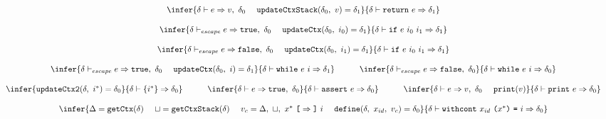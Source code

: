 \documentclass[11pt]{article}
\newcommand{\Term}[1]{\texttt{#1}}
\newcommand{\cs}[0]{\quad}
\newcommand{\symstate}[0]{\delta}
\newcommand{\symctx}[0]{\Delta}
\newcommand{\symctxstack}[0]{\sqcup}
\newcommand{\evalinst}[3]{#1 \vdash #2 \Rightarrow #3}
\newcommand{\evalexpr}[4]{#1 \vdash #2 \Rightarrow #3,\ #4}
\newcommand{\evalescexpr}[4]{#1 \vdash_{escape} #2 \Rightarrow #3,\ #4}
\begin{document}
\[\begin{array}{c}
\infer
{ \evalexpr{\symstate}{e}{v}{\symstate_0}\ \ \ \
\Term{updateCtxStack}(\symstate_0,\ v) = \symstate_1 }
{ \evalinst{\symstate}{\Term{return}\ e}{\symstate_1} }
\\ \\
\infer
{ \evalescexpr{\symstate}{e}{\Term{true}}{\symstate_0}\ \ \ \
\Term{updateCtx}(\symstate_0,\ i_0) = \symstate_1 }
{ \evalinst{\symstate}{\Term{if}\ e\ i_0\ i_1}{\symstate_1} }
\\ \\
\infer
{ \evalescexpr{\symstate}{e}{\Term{false}}{\symstate_0}\ \ \ \
\Term{updateCtx}(\symstate_0,\ i_1) = \symstate_1 }
{ \evalinst{\symstate}{\Term{if}\ e\ i_0\ i_1}{\symstate_1} }
\\ \\
\multicolumn{1}{c}{\begin{array}{ccc}
\infer
{ \evalescexpr{\symstate}{e}{\Term{true}}{\symstate_0}\ \ \ \
\Term{updateCtx}(\symstate_0,\ i) = \symstate_1 }
{ \evalinst{\symstate}{\Term{while}\ e\ i}{\symstate_1} }
&
\cs
&
\infer
{ \evalescexpr{\symstate}{e}{\Term{false}}{\symstate_0} }
{ \evalinst{\symstate}{\Term{while}\ e\ i}{\symstate_0} }
\end{array}}
\\ \\
\multicolumn{1}{c}{\begin{array}{ccccc}
\infer
{ \Term{updateCtx2}(\symstate,\ i^*) = \symstate_0 }
{ \evalinst{\symstate}{\{ i^* \}}{\symstate_0} }
&
\cs
&
\infer
{ \evalexpr{\symstate}{e}{\Term{true}}{\symstate_0} }
{ \evalinst{\symstate}{\Term{assert}\ e}{\symstate_0} }
&
\cs
&
\infer
{ \evalexpr{\symstate}{e}{v}{\symstate_0} \ \ \ \
\Term{print}(v) }
{ \evalinst{\symstate}{\Term{print}\ e}{\symstate_0} }
\end{array}}
\\ \\
\infer
{ \symctx = \Term{getCtx}(\symstate) \ \ \ \
\symctxstack = \Term{getCtxStack}(\symstate) \ \ \ \
v_{c} = \symctx,\ \symctxstack,\ x^*\ \Term{[} \Rightarrow \Term{]}\ i
 \ \ \ \ \Term{define}(\symstate,\ x_{id},\ v_{c}) = \symstate_0 }
{ \evalinst
{\symstate}
{\Term{withcont}\ x_{id}\ \Term{(}x^*\Term{)}\ \Term{=}\ i}
{\symstate_0} }
\end{array}
\]
\end{document}
